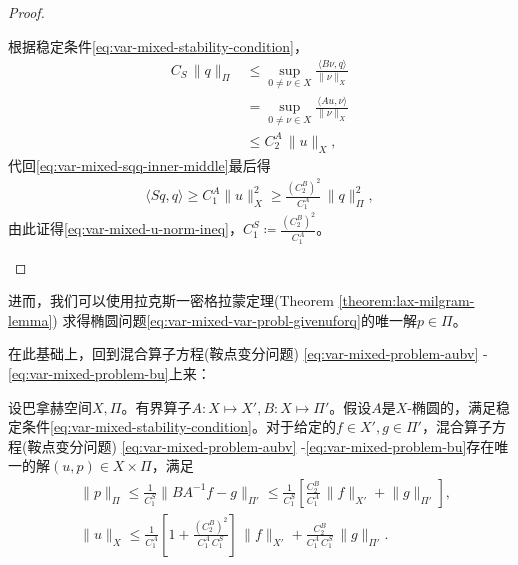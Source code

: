\begin{proof}
\begin{enumerate}
根据稳定条件\eqref{eq:var-mixed-stability-condition}，
\begin{equation*}
  \begin{split}
    C_S \, \big\| q \big\|_{\Pi} & \le \sup_{0 \neq \nu \in X}
    \frac{
    \langle B \nu, q \rangle
    }{
    \big\| \nu \big\|_{X}
    } \\
    & = \sup_{0 \neq \nu \in X}
    \frac{
    \langle A u,  \nu \rangle
    }{
    \big\| \nu \big\|_{X}
    } \\
    & \le C_2^A \, \big\| u \big\|_X,
  \end{split}
\end{equation*}
代回\eqref{eq:var-mixed-sqq-inner-middle}最后得
\begin{equation*}
  \begin{split}
    \langle S q, q \rangle  \ge C_1^A \big\| u \big\|_X^2 \ge \frac{\left( C_2^B \right)^2}{C_1^A} \, \big\| q \big\|_{\Pi}^2,
  \end{split}
\end{equation*}
由此证得\eqref{eq:var-mixed-u-norm-ineq}，$C_1^S \coloneqq \frac{\left( C_2^B \right)^2}{C_1^A}$。
\end{enumerate}
\end{proof}

进而，我们可以使用拉克斯一密格拉蒙定理(Theorem \ref{theorem:lax-milgram-lemma})
求得椭圆问题\eqref{eq:var-mixed-var-probl-givenuforq}的唯一解$ p \in \Pi$。

在此基础上，回到混合算子方程(鞍点变分问题)    \eqref{eq:var-mixed-problem-aubv}
-\eqref{eq:var-mixed-problem-bu}上来：
\begin{theorem}
  \label{theorem:mixed-saddle-point-variational-problem-solution}
  设巴拿赫空间$X,\Pi$。有界算子$A:X \mapsto X', B: X \mapsto \Pi'$。假设$A$是$X$-椭圆的，满足稳定条件\eqref{eq:var-mixed-stability-condition}。对于给定的$f \in X', g \in \Pi'$，混合算子方程(鞍点变分问题)    \eqref{eq:var-mixed-problem-aubv}
  -\eqref{eq:var-mixed-problem-bu}存在唯一的解$(u,p) \in X \times \Pi$，满足
  \begin{align}
    \label{eq:mixed-saddle-point-variational-problem-solution-p}
    & \big\| p \big\|_{\Pi} \le \frac{1}{C_1^S} \big\| B A^{-1} f - g \big\|_{\Pi'} \le \frac{1}{C_1^S} \left[
    \frac{C_2^B}{C_1^A} \, \big\| f \big\|_{X'} + \big\| g \big\|_{\Pi'}
    \right], \\
    \label{eq:mixed-saddle-point-variational-problem-solution-u}
    & \big\| u \big\|_{X} \le \frac{1}{C_1^A} \left[
    1 + \frac{
    \left(C_2^B \right)^2
    }{
    C_1^A \, C_1^S
    }
    \right] \,
    \big\| f \big\|_{X'}
    + \frac{C_2^B}{C_1^A \, C_1^S} \, \big\| g \big\|_{\Pi'}.
  \end{align}
\end{theorem}

